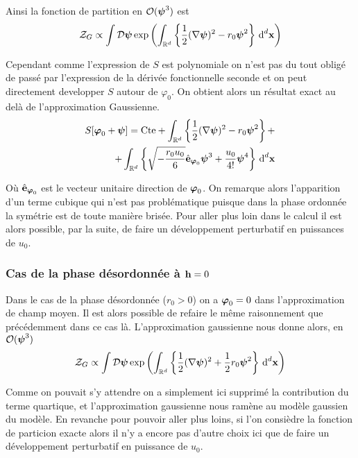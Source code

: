 \documentclass[10pt]{article}
\begin{document}
\begin{multicols}{2}
Ainsi la fonction de partition en $\mathcal{O}(\boldsymbol{ \psi}^3)$ est 
\begin{equation}
  \mathcal{Z}_G \propto \int \mathcal{D} \boldsymbol{ \psi} \exp{\left( \int_{\mathbb{R}^d} \left\{ \frac{1}{2} (\nabla \boldsymbol{ \psi})^2 - r_0 \boldsymbol{ \psi}^2 \right\} \, \text{d}^d {\bf x}\right)}
\end{equation}

Cependant comme l'expression de $S$ est polynomiale on n'est pas du tout obligé de passé par l'expression de la dérivée fonctionnelle seconde et on peut directement developper $S$ autour de $\varphi_0$. On obtient alors un résultat exact au delà de l'approximation Gaussienne.
\begin{equation}
\begin{split}
  S[\boldsymbol{ \varphi}_0 + \boldsymbol{ \psi}] = \text{Cte} + \int_{\mathbb{R}^d} \left\{ \frac{1}{2} (\nabla \boldsymbol{ \psi})^2 - r_0 \boldsymbol{ \psi}^2 \right\} + \\ + \int_{\mathbb{R}^d} \left\{ \sqrt{-\frac{r_0 u_0}{6}} \hat{\mathbf{e}}_{\boldsymbol{ \varphi}_0} \boldsymbol{ \psi}^3 + \frac{u_0}{4!}\boldsymbol{ \psi}^4 \right\} \, \text{d}^d {\bf x}
\end{split}
\end{equation}

Où $\hat{\mathbf{e}}_{\boldsymbol{ \varphi}_0}$ est le vecteur unitaire direction de $\boldsymbol{ \varphi}_0$.  On remarque alors l'apparition d'un terme cubique qui n'est pas problématique puisque dans la phase ordonnée la symétrie est de toute manière brisée. Pour aller plus loin dans le calcul il est alors possible, par la suite, de faire un développement perturbatif en puissances de $u_0$. 

\vspace*{11pt}

\subsubsection{Cas de la phase désordonnée à ${\bf h}=0$}


Dans le cas de la phase désordonnée ($r_0 > 0$) on a $\boldsymbol{ \varphi}_0 = 0$ dans l'approximation de champ moyen. Il est alors possible de refaire le même raisonnement que précédemment dans ce cas là. L'approximation gaussienne nous donne alors, en $\mathcal{O}(\boldsymbol{ \psi}^3)$
\begin{equation}
  \mathcal{Z}_G \propto \int \mathcal{D} \boldsymbol{ \psi} \exp{\left( \int_{\mathbb{R}^d} \left\{ \frac{1}{2} (\nabla \boldsymbol{ \psi})^2 + \frac{1}{2} r_0 \boldsymbol{ \psi}^2 \right\} \, \text{d}^d {\bf x}\right)}
\end{equation}

Comme on pouvait s'y attendre on a simplement ici supprimé la contribution du terme quartique, et l'approximation gaussienne nous ramène au modèle gaussien du modèle. En revanche pour pouvoir aller plus loins, si l'on consièdre la fonction de particion exacte alors il n'y a encore pas d'autre choix ici que de faire un développement perturbatif en puissance de $u_0$.




\end{multicols}
\end{document}
